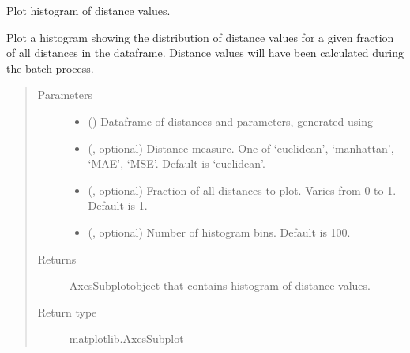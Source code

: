 \documentclass[letterpaper,10pt,english]{sphinxmanual}
\begin{document}

\begin{fulllineitems}
\label{\detokenize{misc:bayescmd.results_handling.histogram_plot}}
Plot histogram of distance values.

Plot a histogram showing the distribution of distance values for a given
fraction of all distances in the dataframe. Distance values will have been
calculated during the batch process.
\begin{quote}\begin{description}
\item[{Parameters}] \leavevmode\begin{itemize}
\item {} 
 () \textendash{} Dataframe of distances and parameters, generated using
{\hyperref[\detokenize{misc:bayescmd.results_handling.data_import}]{}}

\item {} 
 (, optional) \textendash{} Distance measure. One of ‘euclidean’, ‘manhattan’, ‘MAE’, ‘MSE’.
Default is ‘euclidean’.

\item {} 
 (, optional) \textendash{} Fraction of all distances to plot. Varies from 0 to 1. Default is 1.

\item {} 
 (, optional) \textendash{} Number of histogram bins. Default is 100.

\end{itemize}

\item[{Returns}] \leavevmode
AxesSubplotobject that contains histogram of distance values.

\item[{Return type}] \leavevmode
matplotlib.AxesSubplot

\end{description}\end{quote}

\end{fulllineitems}
\end{document}
